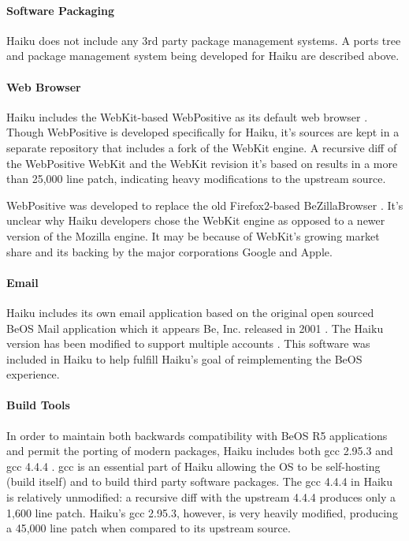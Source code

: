 \documentclass{article}
\begin{document}
\paragraph{Software Packaging}
Haiku does not include any 3rd party package management systems.  A
ports tree and package management system being developed for Haiku are
described above.

\paragraph{Web Browser}
Haiku includes the WebKit-based WebPositive as its default web browser
\cite{WebPositiveWiki}.  Though WebPositive is developed specifically
for Haiku, it's sources are kept in a separate repository
\cite{WebPositiveTrac} that includes a fork of the WebKit engine.  A
recursive diff of the WebPositive WebKit and the WebKit revision it's
based on results in a more than 25,000 line patch, indicating heavy
modifications to the upstream source.

WebPositive was developed to replace the old Firefox2-based
BeZillaBrowser \cite{WebPositiveWiki}.  It's unclear why Haiku
developers chose the WebKit engine as opposed to a newer version of
the Mozilla engine.  It may be because of WebKit's growing market
share and its backing by the major corporations Google and Apple.

\paragraph{Email}
Haiku includes its own email application based on the original open
sourced BeOS Mail application \cite{BeMailOpenSourced} which it
appears Be, Inc. released in 2001 \cite{BeMailLICENSE}.  The Haiku
version has been modified to support multiple accounts
\cite{BeMailOpenSourced}.  This software was included in Haiku to help
fulfill Haiku's goal of reimplementing the BeOS experience.

\paragraph{Build Tools}
In order to maintain both backwards compatibility with BeOS R5
applications and permit the porting of modern packages, Haiku includes
both gcc 2.95.3 and gcc 4.4.4 \cite{GCCHybrids}.  gcc is an essential
part of Haiku allowing the OS to be self-hosting (build itself) and to
build third party software packages.  The gcc 4.4.4 in Haiku is
relatively unmodified: a recursive diff with the upstream 4.4.4
produces only a 1,600 line patch.  Haiku's gcc 2.95.3, however, is
very heavily modified, producing a 45,000 line patch when compared to
its upstream source.
\end{document}
